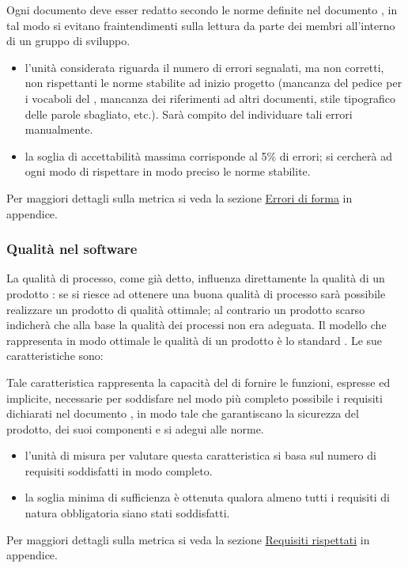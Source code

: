 \documentclass[a4paper, titlepage]{article}
\begin{document}
Ogni documento deve esser redatto secondo le norme definite nel documento , in tal modo si evitano fraintendimenti sulla lettura da parte dei membri all'interno di un gruppo di sviluppo.
\begin{itemize}
\item {} l'unità considerata riguarda il numero di errori  segnalati, ma non corretti, non rispettanti le norme stabilite ad inizio progetto (mancanza del pedice per i vocaboli del , mancanza dei riferimenti ad altri documenti, stile tipografico delle parole sbagliato, etc.). Sarà compito del  individuare tali errori manualmente.
\item {} la soglia di accettabilità massima corrisponde al 5\% di errori; si cercherà ad ogni modo di rispettare in modo preciso le norme stabilite.
\end{itemize}
Per maggiori dettagli sulla metrica si veda la sezione \hyperref[par:errfor]{Errori di forma} in appendice.

\subsubsection{Qualità nel software}
La qualità di processo, come già detto, influenza direttamente la qualità di un prodotto : se si riesce ad ottenere una buona qualità di processo sarà possibile realizzare un prodotto di qualità ottimale; al contrario un prodotto scarso indicherà che alla base la qualità dei processi non era adeguata.
\newline Il modello che rappresenta in modo ottimale le qualità di un prodotto  è lo standard .
\newline Le sue caratteristiche sono:

Tale caratteristica rappresenta la capacità del  di fornire le funzioni, espresse ed implicite, necessarie per soddisfare nel modo più completo possibile i requisiti dichiarati nel documento \AdRdoc, in modo tale che garantiscano la sicurezza del prodotto, dei suoi componenti e si adegui alle norme.
\begin{itemize}
\item {} l'unità di misura per valutare questa caratteristica si basa sul numero di requisiti soddisfatti in modo completo.
\item {} la soglia minima di sufficienza è ottenuta qualora almeno tutti i requisiti di natura obbligatoria siano stati soddisfatti.
\end{itemize}
Per maggiori dettagli sulla metrica si veda la sezione \hyperref[par:req]{Requisiti rispettati} in appendice.
\end{document}
